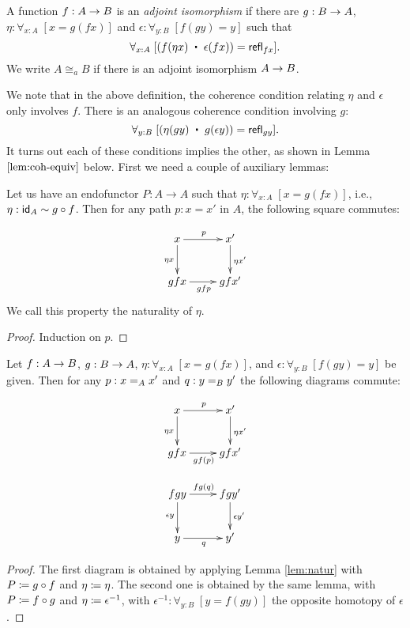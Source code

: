 \begin{defn} A function $f:A\ra B$ is an {\em adjoint isomorphism} if there are $g:B\ra A$, $\eta:\forall_{x:A}\; [x=g(fx)]$ and $\epsilon:\forall_{y:B}\; [f(gy)=y]$ such that 
  \[\forall_{x:A}\;[(\map{f}{\eta x}\; \ct\;\epsilon(fx))=\refl{fx}].\]
We write $A\cong_a B$ if there is an adjoint isomorphism $A\ra B$.
\end{defn}
We note that in the above definition, the coherence condition relating $\eta$ and $\epsilon$ only involves $f$. There is an analogous coherence condition involving $g$:
  \[\forall_{y:B}\;[(\eta(gy) \; \ct\;\map{g}{\epsilon y})=\refl{gy}].\]
It turns out each of these conditions implies the other, as shown in Lemma $\ref{lem:coh-equiv}$ below. First we need a couple of auxiliary lemmas:

\begin{lem}\label{lem:natur}
Let us have an endofunctor $P : A \to A$ such that $\eta : \forall_{x:A}\; [x=g(fx)]$, i.e., $\eta : \idfunc[A] \sim g \circ f$. Then for any path $p : x = x'$ in $A$, the following square commutes:

\[\uppercurveobject{{ }}\lowercurveobject{{ }}\twocellhead{{ }}
  \xymatrix{x \ar^p[r] \ar_{\eta x}[d] & x' \ar^{\eta x'}[d] \\ gfx \ar_{gfp}[r] & gfx'
  }\]
We call this property the naturality of $\eta$.
\end{lem}
\begin{proof}
Induction on $p$.
\end{proof}

\begin{cor}\label{cor:nat-equiv}
Let $f:A\ra B$, $g:B\ra A$, $\eta:\forall_{x:A}\; [x=g(fx)]$, and $\epsilon:\forall_{y:B}\; [f(gy)=y]$ be given. Then for any $p : \id[A]{x}{x'}$ and $q : \id[B]{y}{y'}$ the following diagrams commute:

\[\uppercurveobject{{ }}\lowercurveobject{{ }}\twocellhead{{ }}
  \xymatrix{x \ar^{p}[r] \ar_{\eta x}[d] & x' \ar^{\eta x'}[d] \\ gfx \ar_{gf(p)}[r] & gfx'
  }\]
 
\[\uppercurveobject{{ }}\lowercurveobject{{ }}\twocellhead{{ }}
  \xymatrix{fgy \ar^{fg(q)}[r] \ar_{\epsilon y}[d] & fgy' \ar^{\epsilon y'}[d] \\ y \ar_{q}[r] & y'
  }\]
\end{cor}
\begin{proof}
The first diagram is obtained by applying Lemma \ref{lem:natur} with $P \defeq g \circ f$ and $\eta \defeq \eta$. The second one is obtained by the same lemma, with $P \defeq f \circ g$ and $\eta \defeq \epsilon^{-1}$, with $\epsilon^{-1} : \forall_{y:B}\; [y=f(gy)]$ the opposite homotopy of $\epsilon$. 
\end{proof}

